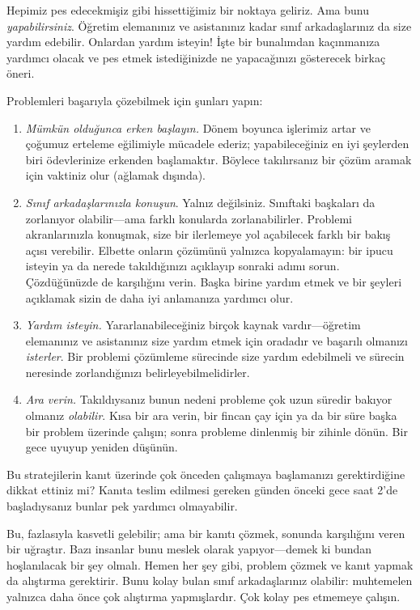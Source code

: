 \documentclass[../../../include/open-logic-section]{subfiles}
\begin{document}


Hepimiz pes edecekmişiz gibi hissettiğimiz bir noktaya geliriz. Ama
bunu \emph{yapabilirsiniz}. Öğretim elemanınız ve asistanınız kadar
sınıf arkadaşlarınız da size yardım edebilir. Onlardan yardım isteyin!{}
İşte bir bunalımdan kaçınmanıza yardımcı olacak ve pes etmek
istediğinizde ne yapacağınızı gösterecek birkaç öneri.

Problemleri başarıyla çözebilmek için şunları yapın:
\begin{enumerate}
\item \emph{Mümkün olduğunca erken başlayın.} Dönem boyunca işlerimiz
  artar ve çoğumuz erteleme eğilimiyle mücadele ederiz; yapabileceğiniz
  en iyi şeylerden biri ödevlerinize erkenden başlamaktır. Böylece
  takılırsanız bir çözüm aramak için vaktiniz olur (ağlamak dışında).
\item \emph{Sınıf arkadaşlarınızla konuşun}. Yalnız değilsiniz.
  Sınıftaki başkaları da zorlanıyor olabilir---ama farklı konularda
  zorlanabilirler. Problemi akranlarınızla konuşmak, size bir ilerlemeye
  yol açabilecek farklı bir bakış açısı verebilir. Elbette onların
  çözümünü yalnızca kopyalamayın: bir ipucu isteyin ya da nerede
  takıldığınızı açıklayıp sonraki adımı sorun. Çözdüğünüzde de karşılığını
  verin. Başka birine yardım etmek ve bir şeyleri açıklamak sizin de
  daha iyi anlamanıza yardımcı olur.
\item \emph{Yardım isteyin.} Yararlanabileceğiniz birçok kaynak
  vardır---öğretim elemanınız ve asistanınız size yardım etmek için
  oradadır ve başarılı olmanızı \emph{isterler}. Bir problemi çözümleme
  sürecinde size yardım edebilmeli ve sürecin neresinde zorlandığınızı
  belirleyebilmelidirler.
\item \emph{Ara verin.} Takıldıysanız bunun nedeni probleme çok uzun
  süredir bakıyor olmanız \emph{olabilir}. Kısa bir ara verin, bir fincan
  çay için ya da bir süre başka bir problem üzerinde çalışın; sonra
  probleme dinlenmiş bir zihinle dönün. Bir gece uyuyup yeniden düşünün.
\end{enumerate}

Bu stratejilerin kanıt üzerinde çok önceden çalışmaya başlamanızı
gerektirdiğine dikkat ettiniz mi? Kanıta teslim edilmesi gereken günden
önceki gece saat 2'de başladıysanız bunlar pek yardımcı olmayabilir.

Bu, fazlasıyla kasvetli gelebilir; ama bir kanıtı çözmek, sonunda
karşılığını veren bir uğraştır. Bazı insanlar bunu meslek olarak
yapıyor---demek ki bundan hoşlanılacak bir şey olmalı. Hemen her şey
gibi, problem çözmek ve kanıt yapmak da alıştırma gerektirir. Bunu kolay
bulan sınıf arkadaşlarınız olabilir: muhtemelen yalnızca daha önce çok
alıştırma yapmışlardır. Çok kolay pes etmemeye çalışın.
\end{document}
